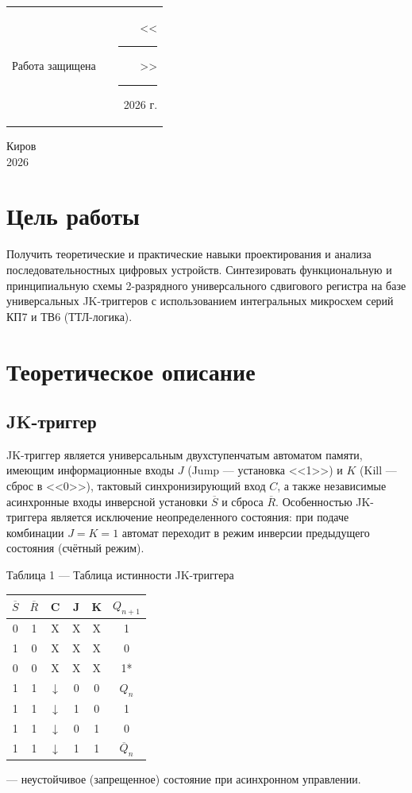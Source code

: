 \documentclass[oneside,a4paper,14pt]{extarticle}
\begin{document}
\noindent
\begin{tabular}{lp{58mm}r}
  Работа защищена &  & \hspace{5mm}<<\rule[-1mm]{5mm}{0.10mm}\/>>\rule[-1mm]{30mm}{0.10mm}\ 2026 г.
\end{tabular}
\vfill

\begin{center}
  Киров\\
  2026
\end{center}

\newpage\thispagestyle{plain}

\section{Цель работы}
Получить теоретические и практические навыки проектирования и анализа последовательностных цифровых устройств. Синтезировать функциональную и принципиальную схемы 2-разрядного универсального сдвигового регистра на базе универсальных JK-триггеров с использованием интегральных микросхем серий КП7 и ТВ6 (ТТЛ-логика).

\section{Теоретическое описание}
\subsection{JK-триггер}
JK-триггер является универсальным двухступенчатым автоматом памяти, имеющим информационные входы $J$ (Jump --- установка <<1>>) и $K$ (Kill --- сброс в <<0>>), тактовый синхронизирующий вход $C$, а также независимые асинхронные входы инверсной установки $\overline{S}$ и сброса $\overline{R}$. Особенностью JK-триггера является исключение неопределенного состояния: при подаче комбинации $J = K = 1$ автомат переходит в режим инверсии предыдущего состояния (счётный режим).

\begin{center}
  Таблица 1 --- Таблица истинности JK-триггера \\
  \vspace{3mm}
  \begin{tabular}{|c|c|c|c|c|c|}
    \hline
    $\overline{S}$ & $\overline{R}$ & C & J & K & $Q_{n+1}$ \\
    \hline
    0 & 1 & X & X & X & 1 \\
    1 & 0 & X & X & X & 0 \\
    0 & 0 & X & X & X & 1* \\
    1 & 1 & $\downarrow$ & 0 & 0 & $Q_n$ \\
    1 & 1 & $\downarrow$ & 1 & 0 & 1 \\
    1 & 1 & $\downarrow$ & 0 & 1 & 0 \\
    1 & 1 & $\downarrow$ & 1 & 1 & $\overline{Q}_n$ \\
    \hline
  \end{tabular}
  \vspace{2mm}
  \par\footnotesize * --- неустойчивое (запрещенное) состояние при асинхронном управлении.
\end{center}
\end{document}
